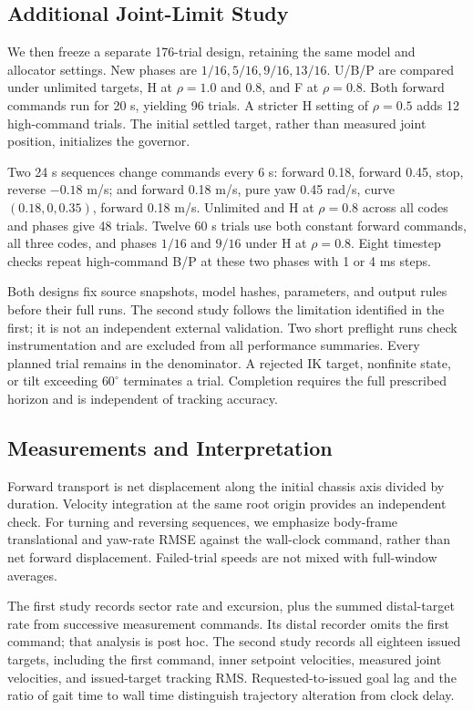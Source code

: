 \documentclass[letterpaper,10pt,conference]{ieeeconf}
\begin{document}
\subsection{Additional Joint-Limit Study}
We then freeze a separate 176-trial design, retaining the same model and allocator settings. New phases are $1/16,5/16,9/16,13/16$. U/B/P are compared under unlimited targets, H at $\rho=1.0$ and 0.8, and F at $\rho=0.8$. Both forward commands run for 20 s, yielding 96 trials. A stricter H setting of $\rho=0.5$ adds 12 high-command trials. The initial settled target, rather than measured joint position, initializes the governor.

Two 24 s sequences change commands every 6 s: forward 0.18, forward 0.45, stop, reverse $-0.18$ m/s; and forward 0.18 m/s, pure yaw 0.45 rad/s, curve $(0.18,0,0.35)$, forward 0.18 m/s. Unlimited and H at $\rho=0.8$ across all codes and phases give 48 trials. Twelve 60 s trials use both constant forward commands, all three codes, and phases $1/16$ and $9/16$ under H at $\rho=0.8$. Eight timestep checks repeat high-command B/P at these two phases with 1 or 4 ms steps.

Both designs fix source snapshots, model hashes, parameters, and output rules before their full runs. The second study follows the limitation identified in the first; it is not an independent external validation. Two short preflight runs check instrumentation and are excluded from all performance summaries. Every planned trial remains in the denominator. A rejected IK target, nonfinite state, or tilt exceeding $60^\circ$ terminates a trial. Completion requires the full prescribed horizon and is independent of tracking accuracy.

\subsection{Measurements and Interpretation}
Forward transport is net displacement along the initial chassis axis divided by duration. Velocity integration at the same root origin provides an independent check. For turning and reversing sequences, we emphasize body-frame translational and yaw-rate RMSE against the wall-clock command, rather than net forward displacement. Failed-trial speeds are not mixed with full-window averages.

The first study records sector rate and excursion, plus the summed distal-target rate from successive measurement commands. Its distal recorder omits the first command; that analysis is post hoc. The second study records all eighteen issued targets, including the first command, inner setpoint velocities, measured joint velocities, and issued-target tracking RMS. Requested-to-issued goal lag and the ratio of gait time to wall time distinguish trajectory alteration from clock delay.
\end{document}
